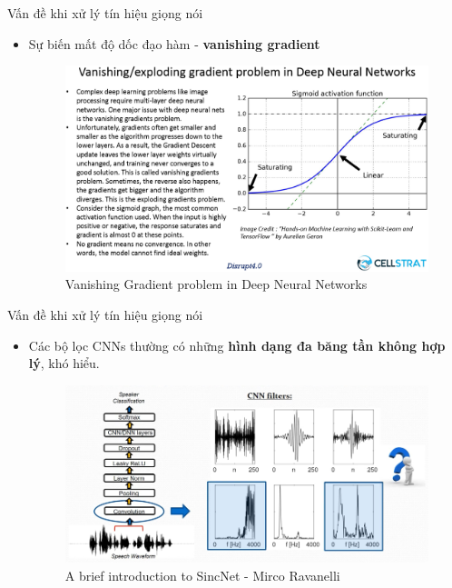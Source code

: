 \documentclass[notheorems, aspectratio=54]{beamer}
\begin{document}
\begin{frame}{Vấn đề khi xử lý tín hiệu giọng nói}
	\begin{itemize}
		\item Sự biến mất độ dốc đạo hàm - \textbf{vanishing gradient}
		\begin{figure}[H]
			\includegraphics[width=0.75\linewidth]{images/Vanishing-Gradients-in-DNN.png}
			\caption{Vanishing Gradient problem in Deep Neural Networks}
			\label{fig:writing-thesis}
		\end{figure}
	\end{itemize}
\end{frame}
\begin{frame}{Vấn đề khi xử lý tín hiệu giọng nói}
	\begin{itemize}
		\item Các bộ lọc CNNs thường có những \textbf{hình dạng đa băng tần không hợp lý}, khó hiểu.
		\begin{figure}[H]
			\includegraphics[width=0.9\linewidth]{images/interpretability_problems.png}
			\caption{A brief introduction to SincNet - Mirco Ravanelli}
			\label{fig:writing-thesis}
		\end{figure}
	\end{itemize}
\end{frame}
\end{document}
